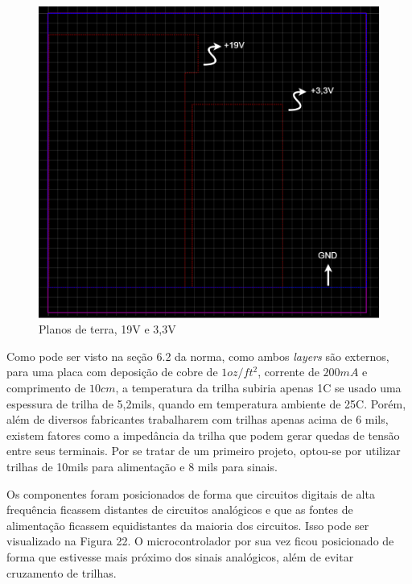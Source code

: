 \documentclass[11pt]{abntex2}
\begin{document}
				\begin{figure}[!ht]
					\centering
					\includegraphics[width=\linewidth]{../Fotos/pcbLayers.png}
					\caption{Planos de terra, 19V e 3,3V}
				\end{figure}

				Como pode ser visto na seção 6.2 da norma, como ambos \textit{layers} são
				externos, para uma placa com deposição de cobre de $1oz/ft^2$,
				corrente de $200mA$ e comprimento de $10cm$, a temperatura da
				trilha subiria apenas 1\textdegree C se usado uma espessura de
				trilha de 5,2mils, quando em temperatura ambiente de
				25\textdegree C. Porém, além de diversos fabricantes trabalharem
				com trilhas apenas acima de 6 mils, existem fatores como a
				impedância da trilha que podem gerar quedas de tensão entre seus
				terminais. Por se tratar de um primeiro projeto, optou-se por
				utilizar trilhas de 10mils para alimentação e 8 mils para
				sinais. 

				Os componentes foram posicionados de forma que circuitos
				digitais de alta frequência ficassem distantes de circuitos
				analógicos e que as fontes de alimentação ficassem equidistantes
				da maioria dos circuitos. Isso pode ser visualizado na Figura
				22. O microcontrolador por sua vez ficou posicionado de forma
				que estivesse mais próximo dos sinais analógicos, além de evitar
				cruzamento de trilhas.
\end{document}
